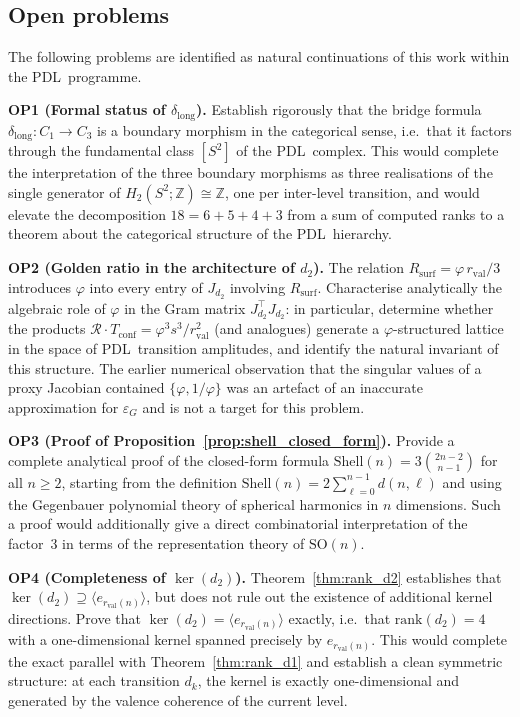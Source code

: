 \documentclass[11pt,a4paper]{article}
\theoremstyle{definition}
\newcommand{\PDL}{\textnormal{PDL}}
\newcommand{\Rsurf}{R_{\mathrm{surf}}}
\newcommand{\rval}{r_{\mathrm{val}}}
\newcommand{\epsg}{\varepsilon_G}
\newcommand{\rank}{\mathrm{rank}}
\newcommand{\dmap}[1]{d_{#1}}
\newcommand{\dlong}{\delta_{\mathrm{long}}}
\newcommand{\calR}{\mathcal{R}}
\newcommand{\vp}{\varphi}
\newcommand{\Shell}{\mathrm{Shell}}
\begin{document}
\subsection{Open problems}
\label{subsec:open}

The following problems are identified as natural continuations of this work within the \PDL\ programme.

\medskip\noindent\textbf{OP1 (Formal status of $\dlong$).} Establish rigorously that the bridge formula $\dlong : C_1 \to C_3$ is a boundary morphism in the categorical sense, i.e.\ that it factors through the fundamental class $[S^2]$ of the \PDL\ complex. This would complete the interpretation of the three boundary morphisms as three realisations of the single generator of $H_2(S^2;\mathbb{Z}) \cong \mathbb{Z}$, one per inter-level transition, and would elevate the decomposition $18 = 6+5+4+3$ from a sum of computed ranks to a theorem about the categorical structure of the \PDL\ hierarchy.

\medskip\noindent\textbf{OP2 (Golden ratio in the architecture of $\dmap{2}$).} The relation $\Rsurf = \vp\,\rval/3$ introduces $\vp$ into every entry of $J_{\dmap{2}}$ involving $\Rsurf$. Characterise analytically the algebraic role of $\vp$ in the Gram matrix $J_{\dmap{2}}^{\!\top} J_{\dmap{2}}$: in particular, determine whether the products $\calR \cdot T_{\mathrm{conf}} = \vp^3 s^3/\rval^2$ (and analogues) generate a $\vp$-structured lattice in the space of \PDL\ transition amplitudes, and identify the natural invariant of this structure. The earlier numerical observation that the singular values of a proxy Jacobian contained $\{\vp, 1/\vp\}$ was an artefact of an inaccurate approximation for $\epsg$ and is not a target for this problem.

\medskip\noindent\textbf{OP3 (Proof of Proposition~\ref{prop:shell_closed_form}).} Provide a complete analytical proof of the closed-form formula $\Shell(n) = 3\binom{2n-2}{n-1}$ for all $n \geq 2$, starting from the definition $\Shell(n) = 2\sum_{\ell=0}^{n-1} d(n,\ell)$ and using the Gegenbauer polynomial theory of spherical harmonics in $n$ dimensions. Such a proof would additionally give a direct combinatorial interpretation of the factor~3 in terms of the representation theory of $\mathrm{SO}(n)$.

\medskip\noindent\textbf{OP4 (Completeness of $\ker(\dmap{2})$).} Theorem~\ref{thm:rank_d2} establishes that $\ker(\dmap{2}) \supseteq \langle e_{\rval(n)}\rangle$, but does not rule out the existence of additional kernel directions. Prove that $\ker(\dmap{2}) = \langle e_{\rval(n)}\rangle$ exactly, i.e.\ that $\rank(\dmap{2}) = 4$ with a one-dimensional kernel spanned precisely by $e_{\rval(n)}$. This would complete the exact parallel with Theorem~\ref{thm:rank_d1} and establish a clean symmetric structure: at each transition $d_k$, the kernel is exactly one-dimensional and generated by the valence coherence of the current level.
\end{document}
